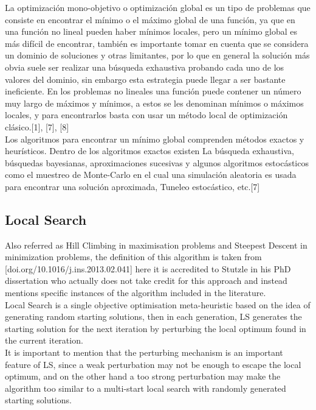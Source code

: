 
La optimización mono-objetivo o optimización global es un tipo de problemas que consiste en encontrar el mínimo o el máximo global de una función, ya que en una función no lineal pueden haber mínimos locales, pero un mínimo global es más difícil de encontrar, también es importante tomar en cuenta que se considera un dominio de soluciones y otras limitantes, por lo que en general la solución más obvia suele ser realizar una búsqueda exhaustiva probando cada uno de los valores del dominio, sin embargo esta estrategia puede llegar a ser bastante ineficiente. En los problemas no lineales una función puede contener un número muy largo de máximos y mínimos, a estos se les denominan mínimos o máximos locales, y para encontrarlos basta con usar un método local de optimización clásico.[1], [7], [8] \\

Los algoritmos para encontrar un mínimo global comprenden métodos exactos y heurísticos. Dentro de los algoritmos exactos existen La búsqueda exhaustiva, búsquedas bayesianas, aproximaciones sucesivas y algunos algoritmos estocásticos como el muestreo de Monte-Carlo en el cual una simulación aleatoria es usada para encontrar una solución aproximada, Tuneleo estocástico, etc.[7] \\

\subsection{Local Search}
 
Also referred as Hill Climbing in maximisation problems and Steepest Descent in minimization problems, the definition of this algorithm is taken from [doi.org/10.1016/j.ins.2013.02.041] here it is accredited to Stutzle in his PhD dissertation who actually does not take credit for this approach and instead mentions specific instances of the algorithm included in the literature.\\

Local Search is a single objective optimisation meta-heuristic based on the idea of generating random starting solutions, then in each generation, LS generates the starting solution for the next iteration by perturbing the local optimum found in the current iteration. \\

It is important to mention that the perturbing mechanism is an important feature of LS, since a weak perturbation may not be enough to escape the local optimum, and on the other hand a too strong perturbation may make the algorithm too similar to a multi-start local search with randomly generated starting solutions. \\

